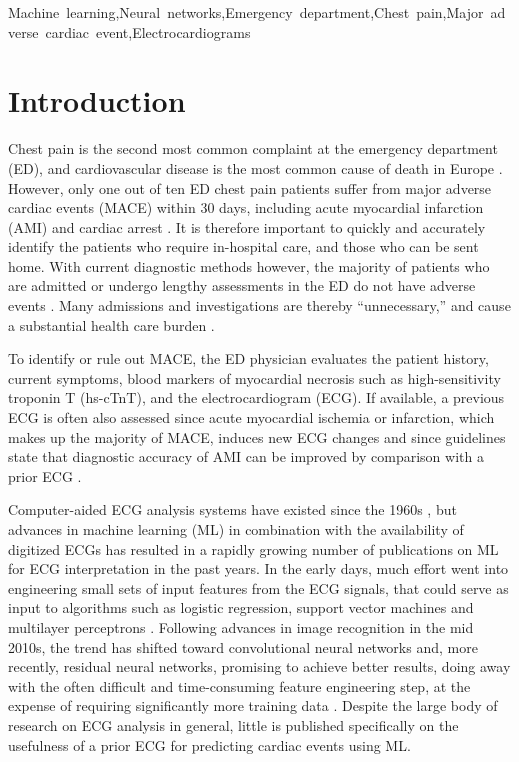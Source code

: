 \documentclass[preprint]{elsarticle}
\begin{document}
\begin{frontmatter}
\begin{keyword}
Machine~learning\sep Neural~networks\sep Emergency~department\sep Chest~pain\sep Major~adverse~cardiac~event\sep Electrocardiograms
\end{keyword}

\end{frontmatter}

\section{Introduction}
\label{sec:introduction}
Chest pain is the second most common complaint at the emergency department (ED), and cardiovascular disease is the most common cause of death in Europe \citep{timmis2022}. However, only one out of ten ED chest pain patients suffer from major adverse cardiac events (MACE) within 30 days, including acute myocardial infarction (AMI) and cardiac arrest \citep{mokhtari2016}. It is therefore important to quickly and accurately identify the patients who require in-hospital care, and those who can be sent home. With current diagnostic methods however, the majority of patients who are admitted or undergo lengthy assessments in the ED do not have adverse events \citep{christenson2004,pollack2006}. Many admissions and investigations are thereby ``unnecessary,'' and cause a substantial health care burden \citep{cullen2015}.

To identify or rule out MACE, the ED physician evaluates the patient history, current symptoms, blood markers of myocardial necrosis such as high-sensitivity troponin T (hs-cTnT), and the electrocardiogram (ECG). If available, a previous ECG is often also assessed since acute myocardial ischemia or infarction, which makes up the majority of MACE, induces new ECG changes and since guidelines state that diagnostic accuracy of AMI can be improved by comparison with a prior ECG \citep{collet2020,lee1990}.

Computer-aided ECG analysis systems have existed since the 1960s \citep{pipberger1961}, but advances in machine learning (ML) in combination with the availability of digitized ECGs has resulted in a rapidly growing number of publications on ML for ECG interpretation in the past years. In the early days, much effort went into engineering small sets of input features from the ECG signals, that could serve as input to algorithms such as logistic regression, support vector machines and multilayer perceptrons \citep{ansari2017}. Following advances in image recognition in the mid 2010s, the trend has shifted toward convolutional neural networks and, more recently, residual neural networks, promising to achieve better results, doing away with the often difficult and time-consuming feature engineering step, at the expense of requiring significantly more training data \citep{hong2020, liu2021, petmezas2022, chennouf2023, xiao2023, boulif2023}. Despite the large body of research on ECG analysis in general, little is published specifically on the usefulness of a prior ECG for predicting cardiac events using ML. 
\end{document}
